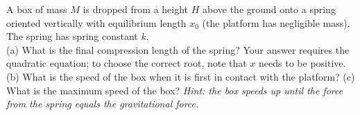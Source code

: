 A box of mass $M$ is dropped from a height $H$ above the ground onto
a spring oriented vertically with equilibrium length $x_0$ (the
platform has negligible mass). The spring has spring constant $k$.\\
%
(a) What is the final compression length of the spring? Your answer
requires the quadratic equation; to choose the correct root, note
that $x$ needs to be positive.\answercheck\hwendpart
%
(b) What is the speed of the box when it is first in contact with the
platform?\answercheck\hwendpart
%
(c) What is the maximum speed of the box? \emph{Hint: the box speeds
up until the force from the spring equals the gravitational force.}\answercheck

